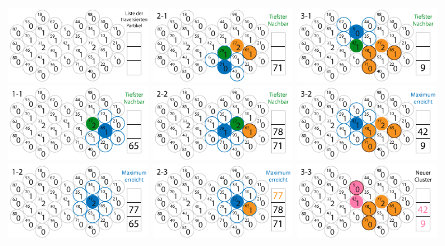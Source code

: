 \documentclass[10pt]{beamer}
\begin{document}
\begin{frame}
	\includegraphics*[width=3.7cm]{media/cluster/cfd000.png} \includegraphics*[width=3.7cm]{media/cluster/cfd004.png} 	\includegraphics*[width=3.7cm]{media/cluster/cfd008.png} \\
	\includegraphics*[width=3.7cm]{media/cluster/cfd001.png} \includegraphics*[width=3.7cm]{media/cluster/cfd005.png} 	\includegraphics*[width=3.7cm]{media/cluster/cfd009.png} \\
	\includegraphics*[width=3.7cm]{media/cluster/cfd002.png} \includegraphics*[width=3.7cm]{media/cluster/cfd006.png} 	\includegraphics*[width=3.7cm]{media/cluster/cfd010.png} \\

\end{frame}
\end{document}
